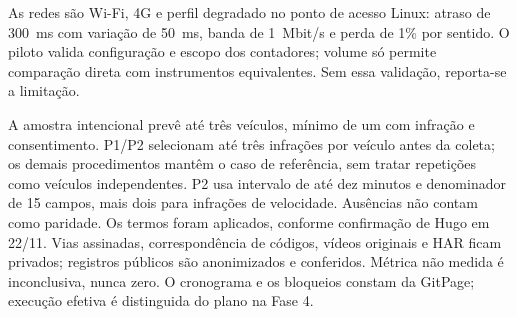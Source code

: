 As redes são Wi-Fi, 4G e perfil degradado no ponto de acesso Linux: atraso de 300~ms com variação de 50~ms, banda de 1~Mbit/s e perda de 1\% por sentido. O piloto valida configuração e escopo dos contadores; volume só permite comparação direta com instrumentos equivalentes. Sem essa validação, reporta-se a limitação.

A amostra intencional prevê até três veículos, mínimo de um com infração e consentimento. P1/P2 selecionam até três infrações por veículo antes da coleta; os demais procedimentos mantêm o caso de referência, sem tratar repetições como veículos independentes. P2 usa intervalo de até dez minutos e denominador de 15 campos, mais dois para infrações de velocidade. Ausências não contam como paridade. Os termos foram aplicados, conforme confirmação de Hugo em 22/11. Vias assinadas, correspondência de códigos, vídeos originais e HAR ficam privados; registros públicos são anonimizados e conferidos. Métrica não medida é inconclusiva, nunca zero. O cronograma e os bloqueios constam da GitPage; execução efetiva é distinguida do plano na Fase 4.
